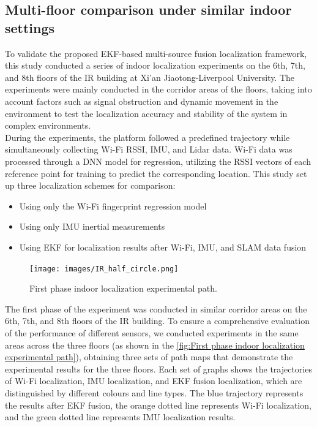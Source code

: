 \documentclass[12pt,a4paper]{article}
\numberwithin{equation}{section}
\begin{document}
\subsection{Multi-floor comparison under similar indoor settings}
To validate the proposed EKF-based multi-source fusion localization framework, this study conducted a series of indoor localization experiments on the 6th, 7th, and 8th floors of the IR building at Xi'an Jiaotong-Liverpool University. The experiments were mainly conducted in the corridor areas of the floors, taking into account factors such as signal obstruction and dynamic movement in the environment to test the localization accuracy and stability of the system in complex environments.\\
During the experiments, the platform followed a predefined trajectory while simultaneously collecting Wi-Fi RSSI, IMU, and Lidar data. Wi-Fi data was processed through a DNN model for regression, utilizing the RSSI vectors of each reference point for training to predict the corresponding location. This study set up three localization schemes for comparison: 
\begin{itemize}
    \item Using only the Wi-Fi fingerprint regression model
    \item Using only IMU inertial measurements
    \item Using EKF for localization results after Wi-Fi, IMU, and SLAM data fusion
\end{itemize}
\begin{figure}[H]
    \centering
    \texttt{[image: images/IR\_half\_circle.png]}
    \caption{First phase indoor localization experimental path.}
    \label{fig:First phase indoor localization experimental path}
\end{figure}
The first phase of the experiment was conducted in similar corridor areas on the 6th, 7th, and 8th floors of the IR building. To ensure a comprehensive evaluation of the performance of different sensors, we conducted experiments in the same areas across the three floors (as shown in the \autoref{fig:First phase indoor localization experimental path}), obtaining three sets of path maps that demonstrate the experimental results for the three floors. Each set of graphs shows the trajectories of Wi-Fi localization, IMU localization, and EKF fusion localization, which are distinguished by different colours and line types. The blue trajectory represents the results after EKF fusion, the orange dotted line represents Wi-Fi localization, and the green dotted line represents IMU localization results.\\
\end{document}
